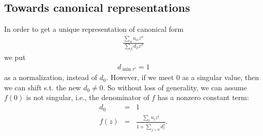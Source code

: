 \documentclass[11pt]{book}
\begin{document}
\subsection{Towards canonical representations}
In order to get a unique representation of canonical form
\begin{eqnarray}
\frac{\sum_\alpha n_\alpha z^\alpha}{\sum_\beta d_\beta z^\beta}
\end{eqnarray}
we put
\begin{eqnarray}
d_{\min r'} = 1
\end{eqnarray}
as a normalization, instead of $d_0$.
However, if we meet 0 as a singular value, then we can shift s.t. the new $d_0 \neq 0$.
So without loss of generality, we can assume $f(0)$ is not singular, i.e., the denominator of $f$ has a nonzero constant term:
\begin{eqnarray}
d_0 &=& 1\\
f(z) &=& \frac{\sum_i n_i z^i}{1 + \sum_{j >0} d_ z^j}.
\end{eqnarray}
\end{document}
